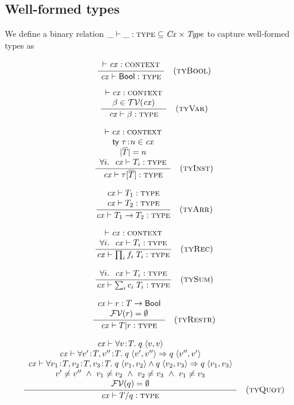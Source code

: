 \subsection{Well-formed types}

We define a binary relation $\binrel{\istyY}{\Cx}{\Typ}$ to capture
well-formed types as

\[
\rruleI
 {\cxwfO}
 {\istyO{\bool}}
 {\Rtbool}
\]

\[
\rruleII
 {\cxwfO}
 {\tvar\in\cxtvarO}
 {\istyO{\tvar}}
 {\Rtvar}
\]

\[
\rruleIV
 {\cxwfO}
 {\tdecO\in\cx}
 {\seqlen{\typS}=n}
 {\FORALL{i}{\istyO{\typ_i}}}
 {\istyO{\tinstO}}
 {\Rtinst}
\]

\[
\rruleII
 {\istyO{\typ_1}}
 {\istyO{\typ_2}}
 {\istyO{\tarrO}}
 {\Rtarr}
\]

\[
\rruleII
 {\cxwfO}
 {\FORALL{i}{\istyO{\typ_i}}}
 {\istyO{\trecO}}
 {\Rtrec}
\]

\[
\rruleI
 {\FORALL{i}{\istyO{\typ_i}}}
 {\istyO{\tsumO}}
 {\Rtsum}
\]

\[
\rruleII
 {\hastyO{\tspred}{\tarr{\typ}{\bool}}}
 {\efvar{\tspred}=\emptyset}
 {\istyO{\tsubO}}
 {\Rtsub}
\]

\[
\rruleV
 {\theoO{\fa{\var}{\typ}{\app{\tqpred}{\tupleII{\var}{\var}}}}}
 {\theoO{\faS{\seqII{\bnd{\var'}{\typ}}{\bnd{\var''}{\typ}}}
             {\impl{\app{\tqpred}{\tupleII{\var'}{\var''}}}
                   {\app{\tqpred}{\tupleII{\var''}{\var'}}}}}}
 {\theoO{\faS{\seqIII{\bnd{\var_1}{\typ}}{\bnd{\var_2}{\typ}}{\bnd{\var_3}{\typ}}}
             {\impl{\conj{\app{\tqpred}{\tupleII{\var_1}{\var_2}}}
                         {\app{\tqpred}{\tupleII{\var_2}{\var_3}}}}
                   {\app{\tqpred}{\tupleII{\var_1}{\var_3}}}}}}
 {\var'\neq\var''\AND\var_1\neq\var_2\AND\var_2\neq\var_3\AND\var_1\neq\var_3}
 {\efvar{\tqpred}=\emptyset}
 {\istyO{\tquotO}}
 {\Rtquot}
\]

